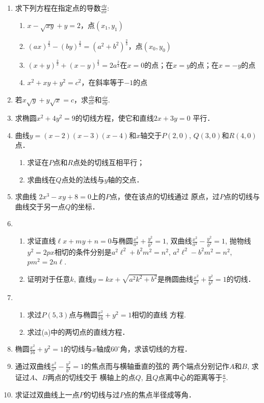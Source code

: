 \begin{ex}
\begin{enumerate}
\item 求下列方程在指定点的导数$\frac{\dd y}{\dd x}$:
\begin{enumerate}
    \item $x-\sqrt{xy}+y=2$，点$(x_1,y_1)$
    \item $(ax)^{\tfrac{2}{3}}-(by)^{\tfrac{2}{3}}=(a^2+b^2)^{\tfrac{2}{3}}$，点$(x_0,y_0)$
    \item $(x+y)^{\tfrac{2}{3}}+(x-y)^{\tfrac{2}{3}}=2a^{\tfrac{2}{3}}$在$x=0$的点；在$x=y$的点；在$x=-y$的点
    \item $x^2+xy+y^2=c^2$，在斜率等于$-1$的点
\end{enumerate}
\item 若$x\sqrt{y}+y\sqrt{x}=c$，求$\frac{\dd y}{\dd x}$和$\frac{\dd x}{\dd y}$.
\item 求椭圆$x^2+4y^2=9$的切线方程，使它和直线$2x+3y=0$
平行．
\item 曲线$y=(x-2)(x-3)(x-4)$和$x$轴交于$P(2, 0)$, $Q(3,0)$和$R(4, 0)$点．
\begin{enumerate}
    \item 求证在$P$点和$R$点处的切线互相平行；
    \item 求曲线在$Q$点处的法线与$y$轴的交点．
\end{enumerate}
\item 求曲线 $2x^3-xy+8=0$上的$P$点，使在该点的切线通过
原点，过$P$点的切线与曲线交于另一点$Q$的坐标．
\item \begin{enumerate}
    \item 求证直线$\ell x +my+n=0$与椭圆$\frac{x^2}{a^2}+\frac{y^2}{b^2}=1$, 双曲线$\frac{x^2}{a^2}-\frac{y^2}{b^2}=1$, 抛物线$y^2=2px$相切的条件分别是$a^2\ell^2+b^2m^2=n^2$, $a^2\ell^2-b^2m^2=n^2$, $pm^2=2n\ell$.
    \item 证明对于任意$k$, 直线$y=kx+\sqrt{a^2k^2+b^2}$是椭圆曲线$\frac{x^2}{a^2}+\frac{y^2}{b^2}=1$的切线．    
\end{enumerate}
\item \begin{enumerate}
    \item 求过$P(5, 3)$点与椭圆$\frac{x^2}{16}+{y^2}=1$相切的直线
    方程.
    \item 求过(a)中的两切点的直线方程．
\end{enumerate}

\item 椭圆$\frac{x^2}{16}+{y^2}=1$的切线与$x$轴成$60^{\circ}$角，求该切线的方程．
\item 通过双曲线$\frac{x^2}{a^2}-\frac{y^2}{b^2}=1$的焦点而与横轴垂直的弦的
两个端点分别记作$A$和$B$, 求证过$A$、$B$两点的切线交于
横轴上的点$Q$, 且$Q$点离中心的距离等于$\frac{a}{e}$.
\item 求证过双曲线上一点$P$的切线与过$P$点的焦点半径成等角．
\end{enumerate}
\end{ex}

